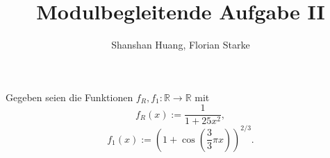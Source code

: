 \documentclass[]{article}
\title{Modulbegleitende Aufgabe II}
\author{Shanshan Huang, Florian Starke}
\newcommand{\R}{\mathbb{R}}
\begin{document}
	\maketitle
	Gegeben seien die Funktionen $f_R,f_1\colon\R\to\R$ mit
	\[f_R(x):=\frac{1}{1+25x^2},\]
	\[f_1(x):=(1+\cos(\frac{3}{3}\pi x))^{2/3}.\]
\end{document}

